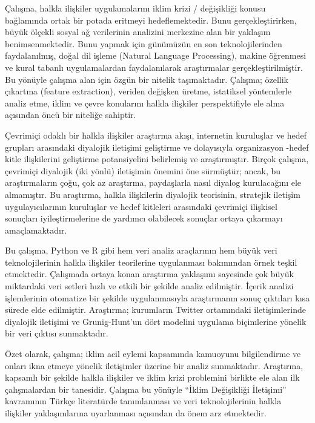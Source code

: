 \documentclass[
]{book}
\begin{document}
Çalışma, halkla ilişkiler uygulamalarını iklim krizi / değişikliği konusu bağlamında ortak bir potada eritmeyi hedeflemektedir. Bunu gerçekleştirirken, büyük ölçekli sosyal ağ verilerinin analizini merkezine alan bir yaklaşım benimsenmektedir. Bunu yapmak için günümüzün en son teknolojilerinden faydalanılmış, doğal dil işleme (Natural Language Processing), makine öğrenmesi ve kural tabanlı uygulamalardan faydalanılarak araştırmalar gerçekleştirilmiştir. Bu yönüyle çalışma alan için özgün bir nitelik taşımaktadır. Çalışma; özellik çıkartma (feature extraction), veriden değişken üretme, istatiksel yöntemlerle analiz etme, iklim ve çevre konularını halkla ilişkiler perspektifiyle ele alma açısından öncü bir niteliğe sahiptir.

Çevrimiçi odaklı bir halkla ilişkiler araştırma akışı, internetin kuruluşlar ve hedef grupları arasındaki diyalojik iletişimi geliştirme ve dolayısıyla organizasyon -hedef kitle ilişkilerini geliştirme potansiyelini belirlemiş ve araştırmıştır. \citep{kelleher2009conversational, kent1998building, kent2002toward} Birçok çalışma, çevrimiçi diyalojik (iki yönlü) iletişimin önemini öne sürmüştür; ancak, bu araştırmaların çoğu, çok az araştırma, paydaşlarla nasıl diyalog kurulacağını ele almamıştır. Bu araştırma, halkla ilişkilerin diyalojik teorisinin, stratejik iletişim uygulayıcılarının kuruluşlar ve hedef kitleleri arasındaki çevrimiçi ilişkisel sonuçları iyileştirmelerine de yardımcı olabilecek sonuçlar ortaya çıkarmayı amaçlamaktadır.

Bu çalışma, Python ve R gibi hem veri analiz araçlarının hem büyük veri teknolojilerinin halkla ilişkiler teorilerine uygulanması bakımından örnek teşkil etmektedir. Çalışmada ortaya konan araştırma yaklaşımı sayesinde çok büyük miktardaki veri setleri hızlı ve etkili bir şekilde analiz edilmiştir. İçerik analizi işlemlerinin otomatize bir şekilde uygulanmasıyla araştırmanın sonuç çıktıları kısa sürede elde edilmiştir. Araştırma; kurumların Twitter ortamındaki iletişimlerinde diyalojik iletişimi ve Grunig-Hunt'un dört modelini uygulama biçimlerine yönelik bir veri çıktısı sunmaktadır.

Özet olarak, çalışma; iklim acil eylemi kapsamında kamuoyunu bilgilendirme ve onları ikna etmeye yönelik iletişimler üzerine bir analiz sunmaktadır. Araştırma, kapsamlı bir şekilde halkla ilişkiler ve iklim krizi problemini birlikte ele alan ilk çalışmalardan bir tanesidir. Çalışma bu yönüyle ``İklim Değişikliği İletişimi'' kavramının Türkçe literatürde tanımlanması ve veri teknolojilerinin halkla ilişkiler yaklaşımlarına uyarlanması açısından da önem arz etmektedir.
\end{document}
